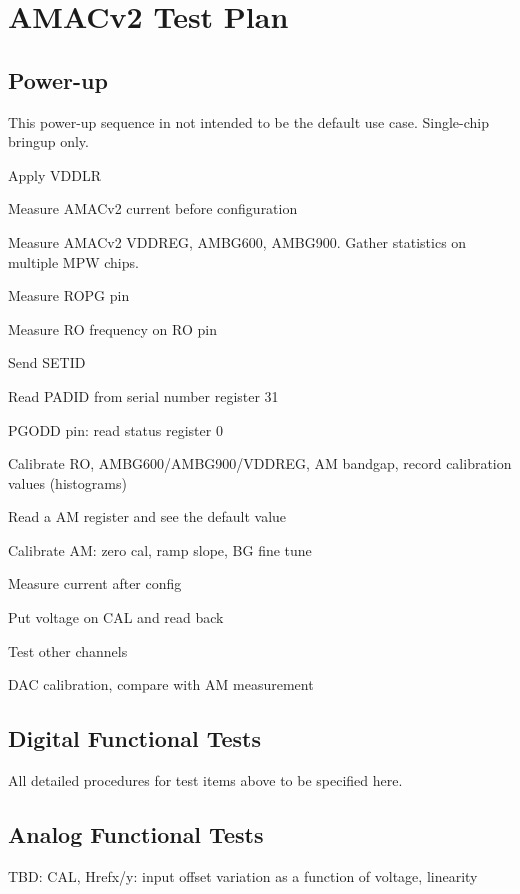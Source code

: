 \documentclass[11pt]{article}   			%
\begin{document}
\newpage

\section{AMACv2 Test Plan}

\subsection{Power-up}
This power-up sequence in not intended to be the default use case. Single-chip bringup only.
\begin{compactitem}
    \item{Apply VDDLR}
    \item{Measure AMACv2 current before configuration}
	\item{Measure AMACv2 VDDREG, AMBG600, AMBG900. Gather statistics on multiple MPW chips.}
    \item{Measure ROPG pin}
    \item{Measure RO frequency on RO pin}
    \item{Send SETID}
    \item{Read PADID from serial number register 31}
    \item{PGODD pin: read status register 0}
    \item{Calibrate RO, AMBG600/AMBG900/VDDREG, AM bandgap, record calibration values (histograms)}
    \item{Read a AM register and see the default value}
    \item{Calibrate AM: zero cal, ramp slope, BG fine tune}
    \item{Measure current after config}
    \item{Put voltage on CAL and read back}
    \item{Test other channels}
    \item{DAC calibration, compare with AM measurement}
\end{compactitem}

\subsection{Digital Functional Tests}
All detailed procedures for test items above to be specified here.

\subsection{Analog Functional Tests}
TBD: CAL, Hrefx/y: input offset variation as a function of voltage, linearity
\end{document}

